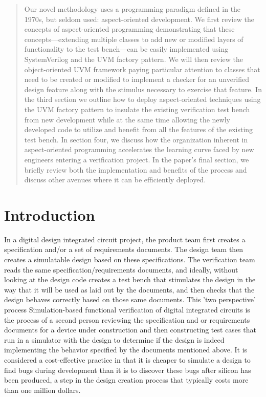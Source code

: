 \documentclass[twocolumn,letterpaper]{IEEEAerospaceCLS}  %
\begin{document}
\begin{abstract}
Our novel methodology uses a programming paradigm defined in the 1970s, but seldom used: aspect-oriented development. We first review the concepts of aspect-oriented programming demonstrating that these concepts—extending multiple classes to add new or modified layers of functionality to the test bench—can be easily implemented using SystemVerilog and the UVM factory pattern. We will then review the object-oriented UVM framework paying particular attention to classes that need to be created or modified to implement a checker for an unverified design feature along with the stimulus necessary to exercise that feature. In the third section we outline how to deploy aspect-oriented techniques using the UVM factory pattern to insulate the existing verification test bench from new development while at the same time allowing the newly developed code to utilize and benefit from all the features of the existing test bench. In section four, we discuss how the organization inherent in aspect-oriented programming accelerates the learning curve faced by new engineers entering a verification project. In the paper’s final section, we briefly review both the implementation and benefits of the process and discuss other avenues where it can be efficiently deployed.

\end{abstract} 


\tableofcontents

\section{Introduction}
In a digital design integrated circuit project, the product team first creates a specification and/or a set of requirements documents. The design team then creates a simulatable design based on these specifications.  The verification team reads the same specification/requirements documents, and ideally, without looking at the design code creates a test bench that stimulates the design in the way that it will be used as laid out by the documents, and then checks that the design behaves correctly based on those same documents. This 'two perspective' process Simulation-based functional verification of digital integrated circuits is the process of a second person reviewing the specification and or requirements documents for a device under construction and then constructing test cases that run in a simulator with the design to determine if the design is indeed implementing the behavior specified by the documents mentioned above. It is considered a cost-effective practice in that it is cheaper to simulate a design to find bugs during development than it is to discover these bugs after silicon has been produced, a step in the design creation process that typically costs more than one million dollars.
\end{document}
